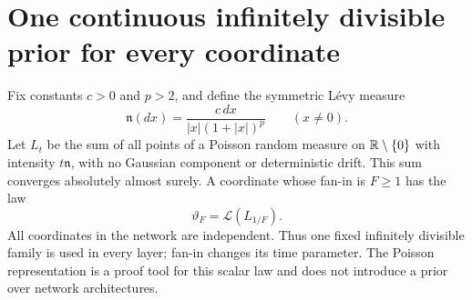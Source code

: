 \section{One continuous infinitely divisible prior for every coordinate}
\label{sec:levy-scalar}
Fix constants $c>0$ and $p>2$, and define the symmetric L\'evy measure
\[
 \mathfrak n(dx)=\frac{c\,dx}{|x|(1+|x|)^p}
 \qquad(x\ne0).
\]
Let $L_t$ be the sum of all points of a Poisson random measure on $\mathbb R\setminus\{0\}$ with intensity $t\mathfrak n$, with no Gaussian component or deterministic drift. This sum converges absolutely almost surely. A coordinate whose fan-in is $F\ge1$ has the law
\begin{equation}
 \vartheta_F=\mathcal L(L_{1/F}).
 \label{eq:levy-coordinate-prior}
\end{equation}
All coordinates in the network are independent. Thus one fixed infinitely divisible family is used in every layer; fan-in changes its time parameter. The Poisson representation is a proof tool for this scalar law and does not introduce a prior over network architectures.

